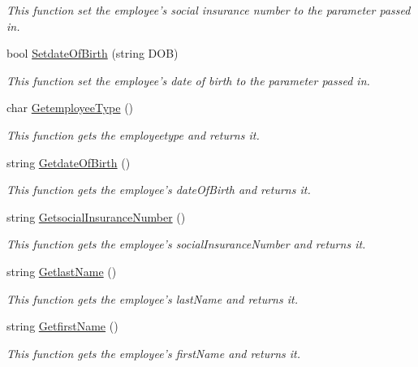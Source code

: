 \begin{DoxyCompactItemize}
\begin{DoxyCompactList}\small\item\em This function set the employee's social insurance number to the parameter passed in. \end{DoxyCompactList}\item 
bool \hyperlink{class_all_employees_1_1_employee_a616bd19527f74d6b48d87e9ebc4998cd}{Setdate\-Of\-Birth} (string D\-O\-B)
\begin{DoxyCompactList}\small\item\em This function set the employee's date of birth to the parameter passed in. \end{DoxyCompactList}\item 
char \hyperlink{class_all_employees_1_1_employee_a7cd62b4d50115db98ae35dfcc1e4fff7}{Getemployee\-Type} ()
\begin{DoxyCompactList}\small\item\em This function gets the employeetype and returns it. \end{DoxyCompactList}\item 
string \hyperlink{class_all_employees_1_1_employee_a60d95e87426154b70358631d7c111bae}{Getdate\-Of\-Birth} ()
\begin{DoxyCompactList}\small\item\em This function gets the employee's date\-Of\-Birth and returns it. \end{DoxyCompactList}\item 
string \hyperlink{class_all_employees_1_1_employee_ab55ae9c4cf52a2fb3d44d3e39a01e5f7}{Getsocial\-Insurance\-Number} ()
\begin{DoxyCompactList}\small\item\em This function gets the employee's social\-Insurance\-Number and returns it. \end{DoxyCompactList}\item 
string \hyperlink{class_all_employees_1_1_employee_afa3e329f842b380e9ed490ac9c137090}{Getlast\-Name} ()
\begin{DoxyCompactList}\small\item\em This function gets the employee's last\-Name and returns it. \end{DoxyCompactList}\item 
string \hyperlink{class_all_employees_1_1_employee_aec350df689a0295ccace3d1dfc1c59f8}{Getfirst\-Name} ()
\begin{DoxyCompactList}\small\item\em This function gets the employee's first\-Name and returns it. \end{DoxyCompactList}\item 

\end{DoxyCompactItemize}
